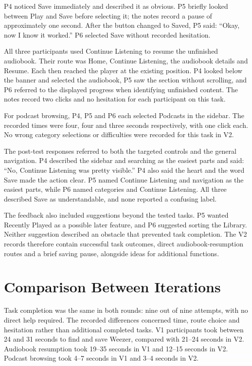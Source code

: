P4 noticed Save immediately and described it as obvious. P5 briefly looked
between Play and Save before selecting it; the notes record a pause of
approximately one second. After the button changed to Saved, P5 said:
``Okay, now I know it worked.'' P6 selected Save without recorded hesitation.


All three participants used Continue Listening to resume the unfinished
audiobook. Their route was Home, Continue Listening, the audiobook details
and Resume. Each then reached the player at the existing position. P4
looked below the banner and selected the audiobook, P5 saw the section
without scrolling, and P6 referred to the displayed progress when identifying
unfinished content. The notes record two clicks and no hesitation for each
participant on this task.

For podcast browsing, P4, P5 and P6 each selected Podcasts in the sidebar.
The recorded times were four, four and three seconds respectively, with
one click each. No wrong category selections or difficulties were recorded
for this task in V2.

The post-test responses referred to both the targeted controls and the
general navigation. P4 described the sidebar and searching as the easiest
parts and said: ``No, Continue Listening was pretty visible.'' P4 also said
the heart and the word Save made the action clear. P5 named Continue
Listening and navigation as the easiest parts, while P6 named categories
and Continue Listening. All three described Save as understandable, and
none reported a confusing label.

The feedback also included suggestions beyond the tested tasks. P5 wanted
Recently Played as a possible later feature, and P6 suggested sorting the
Library. Neither suggestion described an obstacle that prevented task
completion. The V2 records therefore contain successful task outcomes,
direct audiobook-resumption routes and a brief saving pause, alongside
ideas for additional functions.

\section{Comparison Between Iterations}
\label{sec:results-comparison}

Task completion was the same in both rounds: nine out of nine attempts,
with no direct help required. The recorded differences concerned time,
route choice and hesitation rather than additional completed tasks. V1
participants took between 24 and 31 seconds to find and save Weezer,
compared with 21--24 seconds in V2. Audiobook resumption took 19--35 seconds
in V1 and 12--15 seconds in V2. Podcast browsing took 4--7 seconds in V1
and 3--4 seconds in V2.

